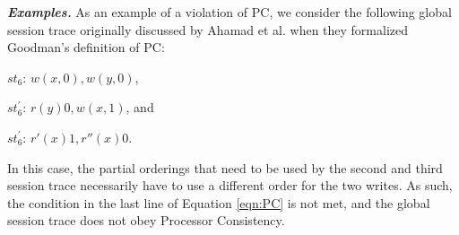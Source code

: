 \documentclass[journal,compsoc]{IEEEtran}
\begin{document}


\noindent \emph{\textbf{Examples.}}
As an example of a violation of PC, we consider the  following global session trace originally discussed by Ahamad et al. \cite{Ahamad:1993:PPC:165231.165264} when they formalized Goodman's definition of PC:

$\mathit{st}_6$: $w(x,0), w(y,0)$, 

$\mathit{st}_6^{'}$:  $ r(y){0}, w(x, 1)$, and 

$\mathit{st}_6^{'}$:  $ r'(x){1}, r''(x){0}$.

In this case, the partial orderings that need to be used by the second and third session trace necessarily have to use a different order for the two writes. As such, the condition in the last line of Equation \ref{eqn:PC} is not met, and the global session trace does not obey Processor Consistency.    
    
\end{document}
